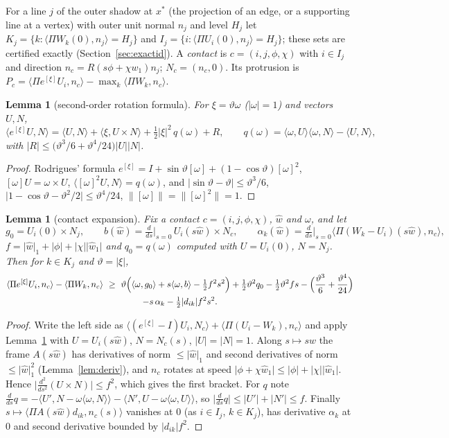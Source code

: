 \documentclass[11pt]{amsart}
\newtheorem{lemma}[theorem]{Lemma}
\theoremstyle{definition}
\newcommand{\Prj}{\Pi}
\newcommand{\ip}[2]{\langle #1,#2\rangle}
\newcommand{\abs}[1]{\lvert #1\rvert}
\newcommand{\norm}[1]{\lVert #1\rVert}
\begin{document}
For a line $j$ of the outer shadow at $x^*$ (the projection of an edge, or a supporting line at a vertex) with outer unit
normal $n_j$ and level $H_j$ let $K_j=\{k:\ip{\Prj W_k(0)}{n_j}=H_j\}$ and $I_j=\{i:\ip{\Prj U_i(0)}{n_j}=H_j\}$; these
sets are certified exactly (Section~\ref{sec:exactid}). A \emph{contact} is $c=(i,j,\phi,\chi)$ with $i\in I_j$ and
direction $n_c=R(s\phi+\chi w_1)n_j$; $N_c=(n_c,0)$. Its protrusion is
$P_c=\ip{\Prj e^{[\xi]}U_i}{n_c}-\max_k\ip{\Prj W_k}{n_c}$.

\begin{lemma}[second-order rotation formula]\label{lem:rot}
For $\xi=\vartheta\omega$ ($\abs\omega=1$) and vectors $U,N$,
\[
\ip{e^{[\xi]}U}{N}=\ip UN+\ip{\xi}{U\times N}+\tfrac12\abs\xi^2\,q(\omega)+R,\qquad
q(\omega)=\ip\omega U\ip\omega N-\ip UN,
\]
with $\abs R\le\bigl(\vartheta^3/6+\vartheta^4/24\bigr)\abs U\abs N$.
\end{lemma}
\begin{proof}
Rodrigues' formula $e^{[\xi]}=I+\sin\vartheta[\omega]+(1-\cos\vartheta)[\omega]^2$, $[\omega]U=\omega\times U$,
$\ip{[\omega]^2U}{N}=q(\omega)$, and $\abs{\sin\vartheta-\vartheta}\le\vartheta^3/6$,
$\abs{1-\cos\vartheta-\vartheta^2/2}\le\vartheta^4/24$, $\norm{[\omega]}=\norm{[\omega]^2}=1$.
\end{proof}

\begin{lemma}[contact expansion]\label{lem:contact}
Fix a contact $c=(i,j,\phi,\chi)$, $\hat w$ and $\omega$, and let
\[
g_0=U_i(0)\times N_j,\qquad b(\hat w)=\tfrac{d}{ds}\big|_{s=0}\,U_i(s\hat w)\times N_c,\qquad
\alpha_k(\hat w)=\tfrac{d}{ds}\big|_{s=0}\ip{\Prj(W_k-U_i)(s\hat w)}{n_c},
\]
$f=\abs{\hat w}_1+\abs\phi+\abs\chi\abs{\hat w_1}$ and $q_0=q(\omega)$ computed with $U=U_i(0)$, $N=N_j$. Then for
$k\in K_j$ and $\vartheta=\abs\xi$,
\begin{multline*}
\ip{\Prj e^{[\xi]}U_i}{n_c}-\ip{\Prj W_k}{n_c}\ \ge\ \vartheta\Bigl(\ip\omega{g_0}+s\ip\omega b-\tfrac12f^2s^2\Bigr)
+\tfrac12\vartheta^2q_0-\tfrac12\vartheta^2fs-\Bigl(\frac{\vartheta^3}6+\frac{\vartheta^4}{24}\Bigr)\\
-s\,\alpha_k-\tfrac12\abs{d_{ik}}f^2s^2 .
\end{multline*}
\end{lemma}
\begin{proof}
Write the left side as $\ip{(e^{[\xi]}-I)U_i}{N_c}+\ip{\Prj(U_i-W_k)}{n_c}$ and apply Lemma~\ref{lem:rot} with
$U=U_i(s\hat w)$, $N=N_c(s)$, $\abs U=\abs N=1$. Along $s\mapsto s\hat w$ the frame $A(s\hat w)$ has derivatives of norm
$\le\abs{\hat w}_1$ and second derivatives of norm $\le\abs{\hat w}_1^2$ (Lemma~\ref{lem:deriv}), and $n_c$ rotates at
speed $\abs{\phi+\chi\hat w_1}\le\abs\phi+\abs\chi\abs{\hat w_1}$. Hence $\abs{\frac{d^2}{ds^2}(U\times N)}\le f^2$, which
gives the first bracket. For $q$ note $\frac{d}{ds}q=-\ip{U'}{N-\omega\ip\omega N}-\ip{N'}{U-\omega\ip\omega U}$, so
$\abs{\frac{d}{ds}q}\le\abs{U'}+\abs{N'}\le f$. Finally $s\mapsto\ip{\Prj A(s\hat w)d_{ik}}{n_c(s)}$ vanishes at $0$ (as
$i\in I_j$, $k\in K_j$), has derivative $\alpha_k$ at $0$ and second derivative bounded by $\abs{d_{ik}}f^2$.
\end{proof}
\end{document}

